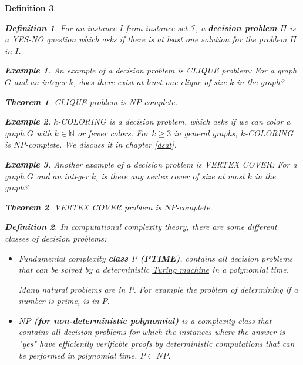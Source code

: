 \documentclass[12pt]{article}
\theoremstyle{slplain}
\newtheorem{theorem}{Theorem}
\newtheorem{defi}{Definition}
\newtheorem{exam}{Example}
\begin{document}
\begin{defi}
\begin{defi}
For an instance $I$ from instance set $\mathcal{I}$, a {\bf decision problem} $\Pi$ is a YES-NO question which asks if
there is at least one solution for the problem $\Pi$ in $I$.
\end{defi}

\begin{exam}
An example of a decision problem is CLIQUE problem: For a graph $G$ and an integer $k$, does there exist at least one clique of size $k$ in the graph? 
\end{exam}

\begin{theorem}
CLIQUE problem is $NP$-complete. \cite{karp}
\end{theorem}

\begin{exam}
$k$-COLORING is a decision problem, which asks if we can color a graph $G$ with $k\in\mathbb{N}$ or fewer colors. For $k \geq 3$ in general graphs, $k$-COLORING is $NP$-complete. We discuss it in chapter \ref{dsat}.
\end{exam}

\begin{exam}
Another example of a decision problem is VERTEX COVER: For a graph $G$ and an integer $k$, is there any vertex cover of size at most $k$ in the graph? 
\end{exam}

\begin{theorem}
VERTEX COVER problem is $NP$-complete. \cite{karp}
\end{theorem}

\begin{defi}
In computational complexity theory, there are some different classes of decision problems:

\begin{itemize}
\item Fundamental complexity {\bf class $P$ (PTIME)}, contains all decision problems that can be solved by a deterministic \href{https://en.wikipedia.org/wiki/Turing_machine}{Turing machine}\cite{turing} in a polynomial time. 

Many natural problems are in $P$. For example the problem of determining if a number is prime, is in $P$\cite{manindra}.

\item {\bf $NP$ (for non-deterministic polynomial)} is a complexity class that contains all decision problems for which the instances where the answer is "yes" have efficiently verifiable proofs by deterministic computations that can be performed in polynomial time. $P\subset NP$.


\end{itemize}
\end{defi}
\end{defi}
\end{document}
